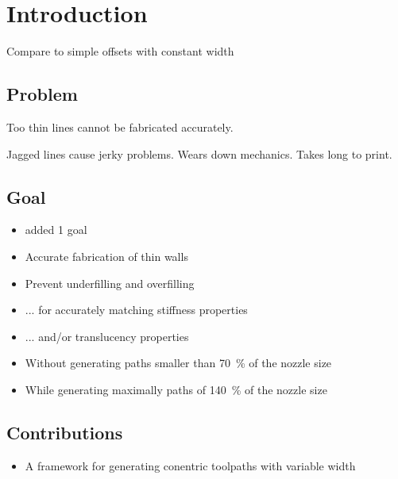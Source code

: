 \section{Introduction}

Compare to simple offsets with constant width

\subsection{Problem}
Too thin lines cannot be fabricated accurately.

Jagged lines cause jerky problems.
Wears down mechanics.
Takes long to print.



\subsection{Goal}
\begin{itemize}
\item added 1 goal
\item Accurate fabrication of thin walls
\item Prevent underfilling and overfilling
\item ... for accurately matching stiffness properties
\item ... and/or translucency properties
\item Without generating paths smaller than \SI{70}{\percent} of the nozzle size
\item While generating maximally paths of \SI{140}{\percent} of the nozzle size
\end{itemize}



\subsection{Contributions}
\begin{itemize}
\item A framework for generating conentric toolpaths with variable width
\end{itemize}
